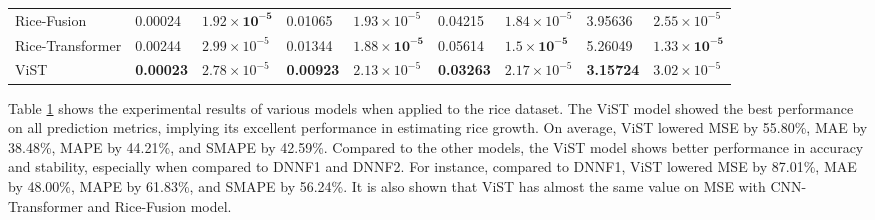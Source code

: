 \documentclass[acmsmall, screen]{acmart}
\begin{document}
\begin{table}[htbp]
{\begin{tabular}{lllllllll}
      Rice-Fusion & 0.00024 & \begin{math}\mathbf{1.92\times 10^{-5}}\end{math} & 0.01065 & \begin{math}1.93\times 10^{-5}\end{math} & 0.04215 & \begin{math}1.84\times 10^{-5}\end{math} & 3.95636 & \begin{math}2.55\times 10^{-5}\end{math} \\
      Rice-Transformer & 0.00244 & \begin{math}2.99\times 10^{-5}\end{math} & 0.01344 & \begin{math}\mathbf{1.88\times 10^{-5}}\end{math} & 0.05614 & \begin{math}\mathbf{1.5\times 10^{-5}}\end{math} & 5.26049 & \begin{math}\mathbf{1.33\times 10^{-5}}\end{math} \\
      ViST  & \textbf{0.00023} & \begin{math}2.78\times 10^{-5}\end{math} & \textbf{0.00923} & \begin{math}2.13\times 10^{-5}\end{math} & \textbf{0.03263} & \begin{math}2.17\times 10^{-5}\end{math} & \textbf{3.15724} & \begin{math}3.02\times 10^{-5}\end{math} \\
      \bottomrule
      \end{tabular}%
  }
    
  \label{rice_results}%
\end{table}%



Table \ref{rice_results} shows the experimental results of various models when applied to the rice dataset. The ViST model showed the best performance on all prediction metrics, implying its excellent performance in estimating rice growth. On average, ViST lowered MSE by 55.80\%, MAE by 38.48\%, MAPE by 44.21\%, and SMAPE by 42.59\%. Compared to the other models, the ViST model shows better performance in accuracy and stability, especially when compared to DNNF1 and DNNF2. For instance, compared to DNNF1, ViST lowered MSE by 87.01\%, MAE by 48.00\%, MAPE by 61.83\%, and SMAPE by 56.24\%. It is also shown that ViST has almost the same value on MSE with CNN-Transformer and Rice-Fusion model.
\end{document}
